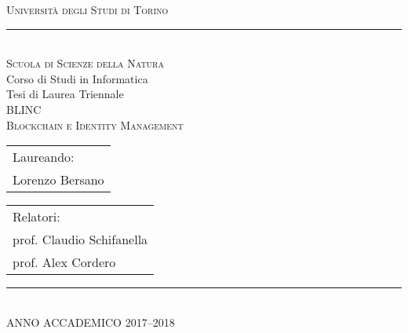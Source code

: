 \thispagestyle{empty}
\setcounter{page}{0}

\begin{center}
\Large
\textsc{Universit\`a degli Studi di Torino}\\
\vspace{-0.4cm}
\rule{\textwidth}{0.1mm}\\
\large
\textsc{Scuola di Scienze della Natura}\\ 
\bigskip
Corso di Studi in Informatica \\
\vfill %
Tesi di Laurea Triennale \\
\vfill %
\Large
\textsc{BLINC}\\
\textsc{Blockchain e Identity Management}
\end{center}
\vfill
\begin{tabular}[t]{l}
Laureando:\\
Lorenzo Bersano
\end{tabular}
\hfill 
\begin{tabular}[t]{l}
Relatori: \\
prof. Claudio Schifanella \\
prof. Alex Cordero
\end{tabular}
\vfill
\begin{center}
\normalsize
\rule{8cm}{0.1mm}\\
\bigskip
ANNO ACCADEMICO 2017--2018
\end{center}
